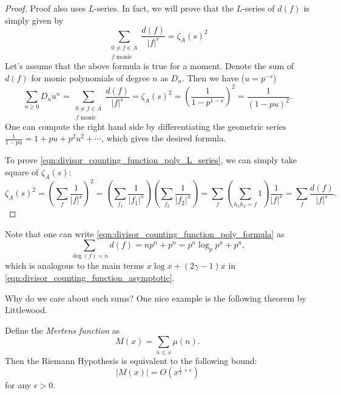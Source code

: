 \begin{proof}
    Proof also uses $L$-series.
    In fact, we will prove that the $L$-series of $d(f)$ is simply given by
    \begin{equation}
        \sum_{\substack{0 \ne f \in A \\ f\text{ monic}}} \frac{d(f)}{|f|^s} = \zeta_A(s)^2
        \label{eqn:divisor_counting_function_poly_L_series}
    \end{equation}
    Let's assume that the above formula is true for a moment.
    Denote the sum of $d(f)$ for monic polynomials of degree $n$ as $D_n$.
    Then we have ($u = p^{-s}$)
    \[
    \sum_{n \ge 0} D_n u^n = \sum_{\substack{0 \ne f \in A \\ f\text{ monic}}} \frac{d(f)}{|f|^s} = \zeta_A(s)^2 = \left(\frac{1}{1 - p^{1 - s}}\right)^2 = \frac{1}{(1 - pu)^2}.
    \]
    One can compute the right hand side by differentiating the geometric series $\frac{1}{1 - pu} = 1 + pu + p^2 u^2 + \cdots$, which gives the desired formula.

    To prove \eqref{eqn:divisor_counting_function_poly_L_series}, we can simply take square of $\zeta_A(s)$:
    \[
    \zeta_A(s)^2 = \left(\sum_{f} \frac{1}{|f|^s}\right)^2 = \left(\sum_{f_1} \frac{1}{|f_1|^s}\right) \left(\sum_{f_2} \frac{1}{|f_2|^s}\right) = \sum_{f} \left(\sum_{h_1 h_2 = f} 1\right) \frac{1}{|f|^s} = \sum_{f} \frac{d(f)}{|f|^s}.
    \]
\end{proof}
Note that one can write \eqref{eqn:divisor_counting_function_poly_formula} as
\[
\sum_{\deg(f) = n} d(f) = n p^n + p^n = p^n \log_p p^n + p^n,
\]
which is analogous to the main terms $x \log x + (2\gamma - 1)x$ in \eqref{eqn:divisor_counting_function_asymptotic}.

Why do we care about such sums?
One nice example is the following theorem by Littlewood.
\begin{theorem}[Littlewood]
    Define the \emph{Mertens function} as
    \begin{equation}
        M(x) = \sum_{n \le x} \mu(n).
        \label{eqn:mertens_function}
    \end{equation}
    Then the Riemann Hypothesis is equivalent to the following bound:
    \begin{equation}
        |M(x)| = O(x^{\frac{1}{2} + \epsilon})
        \label{eqn:mertens_bound}
    \end{equation}
    for any $\epsilon > 0$.
\end{theorem}

